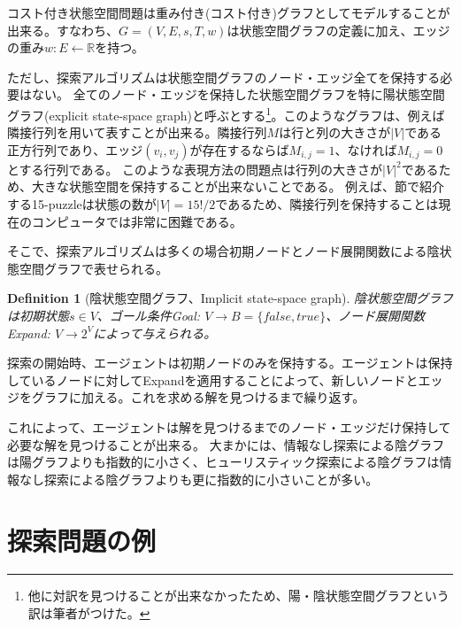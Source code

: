 \documentclass{report}
\newtheorem{definition}{Definition}
\begin{document}
コスト付き状態空間問題は重み付き(コスト付き)グラフとしてモデルすることが出来る。すなわち、$G = (V, E, s, T, w)$は状態空間グラフの定義に加え、エッジの重み$w: E \leftarrow \mathbb{R}$を持つ。

ただし、探索アルゴリズムは状態空間グラフのノード・エッジ全てを保持する必要はない。
全てのノード・エッジを保持した状態空間グラフを特に陽状態空間グラフ(explicit state-space graph)と呼ぶとする\footnote{他に対訳を見つけることが出来なかったため、陽・陰状態空間グラフという訳は筆者がつけた。}。このようなグラフは、例えば隣接行列を用いて表すことが出来る。隣接行列$M$は行と列の大きさが$|V|$である正方行列であり、エッジ$(v_i, v_j)$が存在するならば$M_{i,j}=1$、なければ$M_{i,j}=0$とする行列である。
このような表現方法の問題点は行列の大きさが$|V|^2$であるため、大きな状態空間を保持することが出来ないことである。
例えば、節で紹介する15-puzzleは状態の数が$|V|=15!/2$であるため、隣接行列を保持することは現在のコンピュータでは非常に困難である。

そこで、探索アルゴリズムは多くの場合初期ノードとノード展開関数による陰状態空間グラフで表せられる。

\begin{definition}[陰状態空間グラフ、Implicit state-space graph]
陰状態空間グラフは初期状態$s \in V$、ゴール条件Goal: $V \rightarrow B = \{false, true\}$、ノード展開関数Expand: $V \rightarrow 2^V$によって与えられる。
\end{definition}

探索の開始時、エージェントは初期ノードのみを保持する。エージェントは保持しているノードに対してExpandを適用することによって、新しいノードとエッジをグラフに加える。これを求める解を見つけるまで繰り返す。



これによって、エージェントは解を見つけるまでのノード・エッジだけ保持して必要な解を見つけることが出来る。
大まかには、情報なし探索による陰グラフは陽グラフよりも指数的に小さく、ヒューリスティック探索による陰グラフは情報なし探索による陰グラフよりも更に指数的に小さいことが多い。


\section{探索問題の例}
\label{sec:search-problem}
\end{document}
